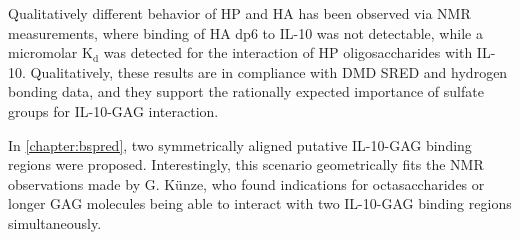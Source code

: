 Qualitatively different behavior of HP and HA has been observed via NMR
measurements, where binding of HA dp6 to IL-10 was not detectable, while a
micromolar $\mathrm{K}_\mathrm{d}$ was detected for the interaction of HP
oligosaccharides with IL-10. Qualitatively, these results are in compliance with
DMD SRED and hydrogen bonding data, and they support the rationally expected
importance of sulfate groups for IL-10-GAG interaction.

In \cref{chapter:bspred}, two symmetrically aligned putative IL-10-GAG binding
regions were proposed. Interestingly, this scenario geometrically fits the NMR
observations made by G. Künze, who found indications for octasaccharides or
longer GAG molecules being able to interact with two IL-10-GAG binding regions
simultaneously.
